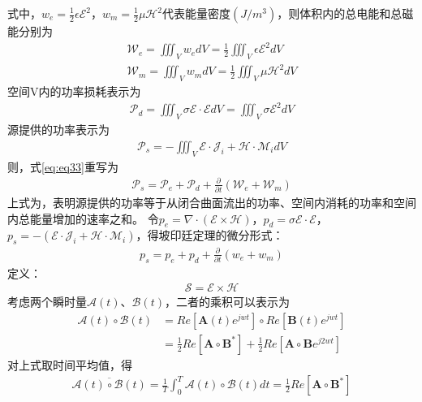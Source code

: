 \documentclass{article}
\numberwithin{equation}{section}
\renewcommand{\vec}[1]{\boldsymbol{#1}}
\begin{document}
式中，$w_e=\frac{1}{2}\epsilon \mathcal{E}^2$，$w_m=\frac{1}{2}\mu \mathcal{H}^2$代表能量密度$(J/m^3)$，则体积内的总电能和总磁能分别为
\begin{align}
    \label{eq:eq37}
    \mathcal{W}_e=\iiint _V w_e dV =\frac{1}{2}\iiint _V \epsilon\mathcal{E}^2 dV \\
    \label{eq:eq38}
    \mathcal{W}_m=\iiint _V w_m dV =\frac{1}{2}\iiint _V \mu\mathcal{H}^2 dV
\end{align}
空间V内的功率损耗表示为
\begin{align}
    \label{eq:eq39}
    \mathcal{P}_d=\iiint _V \sigma \vec{\mathcal{E}}\cdot \vec{\mathcal{E}} dV=\iiint _V \sigma \mathcal{E}^2 dV
\end{align}
源提供的功率表示为
\begin{align}
    \label{eq:eq40}
    \mathcal{P}_s=-\iiint _V \vec{\mathcal{E}}\cdot \vec{\mathcal{J}}_i+\vec{\mathcal{H}}\cdot \vec{\mathcal{M}}_i dV
\end{align}
则，式\ref{eq:eq33}重写为
\begin{align}
    \label{eq:eq41}
    \mathcal{P}_s=\mathcal{P}_e+\mathcal{P}_d+\frac{\partial}{\partial t}(\mathcal{W}_e+\mathcal{W}_m)
\end{align}
上式为\textbf{\color{blue}{坡印廷定理}}，表明源提供的功率等于从闭合曲面流出的功率、空间内消耗的功率和空间内总能量增加的速率之和。
令$p_e=\nabla \cdot (\vec{\mathcal{E}} \times \vec{\mathcal{H}})$，$p_d=\sigma \vec{\mathcal{E}}\cdot \vec{\mathcal{E}}$，$p_s=-(\vec{\mathcal{E}}\cdot \vec{\mathcal{J}}_i+\vec{\mathcal{H}}\cdot \vec{\mathcal{M}}_i)$，得坡印廷定理的微分形式：
\begin{align}
    \label{eq:eq42}
    p_s=p_e+p_d+\frac{\partial}{\partial t}(w_e+w_m)
\end{align}
定义\textbf{\color{blue}{坡印廷矢量}}：
\begin{align}
    \vec{\mathcal{S}}=\vec{\mathcal{E}} \times \vec{\mathcal{H}}
\end{align}
考虑两个瞬时量$\vec{\mathcal{A}}(t)$、$\vec{\mathcal{B}}(t)$，二者的乘积可以表示为
\begin{align}
    \label{eq:eq47}
    \vec{\mathcal{A}}(t)\circ \vec{\mathcal{B}}(t)&=Re[\mathbf{A}(t)e^{jwt}]\circ Re[\mathbf{B}(t)e^{jwt}] \nonumber \\
                                                  &=\frac{1}{2}Re[\mathbf{A} \circ \mathbf{B}^*]+\frac{1}{2}Re[\mathbf{A} \circ \mathbf{B}e^{j2wt}]
\end{align}
对上式取时间平均值，得
\begin{align}
    \overline{\vec{\mathcal{A}}(t)\circ \vec{\mathcal{B}}(t)}=\frac{1}{T}\int_{0}^{T}\vec{\mathcal{A}}(t)\circ \vec{\mathcal{B}}(t) dt =\frac{1}{2}Re[\mathbf{A} \circ \mathbf{B}^*]
\end{align}
\end{document}
